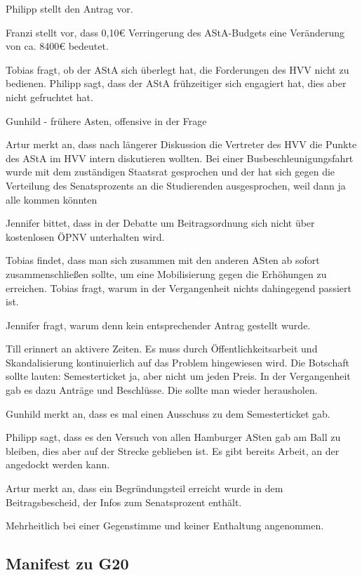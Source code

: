 \documentclass[ngerman,headheight=70pt]{scrartcl}
\begin{document}
    Philipp stellt den Antrag vor.

    Franzi stellt vor, dass 0,10€ Verringerung des AStA-Budgets eine Veränderung
    von ca. 8400€ bedeutet.

    Tobias fragt, ob der AStA sich überlegt hat, die Forderungen des HVV nicht
    zu bedienen. Philipp sagt, dass der AStA frühzeitiger sich engagiert hat,
    dies aber nicht gefruchtet hat.

    Gunhild - frühere Asten, offensive in der Frage

    Artur merkt an, dass nach längerer Diskussion die Vertreter des HVV die
    Punkte des AStA im HVV intern diskutieren wollten. Bei einer Busbeschleunigungsfahrt
    wurde mit dem zuständigen Staatsrat gesprochen und der hat sich gegen die Verteilung
    des Senatsprozents an die Studierenden ausgesprochen, weil dann ja alle kommen
    könnten

    Jennifer bittet, dass in der Debatte um Beitragsordnung sich nicht über
    kostenlosen ÖPNV unterhalten wird.

    Tobias findet, dass man sich zusammen mit den anderen ASten ab sofort
    zusammenschließen sollte, um eine Mobilisierung gegen die Erhöhungen zu
    erreichen. Tobias fragt, warum in der Vergangenheit nichts dahingegend passiert
    ist.

    Jennifer fragt, warum denn kein entsprechender Antrag gestellt wurde.

    Till erinnert an aktivere Zeiten. Es muss durch Öffentlichkeitsarbeit und
    Skandalisierung kontinuierlich auf das Problem hingewiesen wird. Die Botschaft
    sollte lauten: Semesterticket ja, aber nicht um jeden Preis.
    In der Vergangenheit gab es dazu Anträge und Beschlüsse. Die sollte man
    wieder herausholen.

    Gunhild merkt an, dass es mal einen Ausschuss zu dem Semesterticket gab.

    Philipp sagt, dass es den Versuch von allen Hamburger ASten gab am Ball zu
    bleiben, dies aber auf der Strecke geblieben ist. Es gibt bereits Arbeit,
    an der angedockt werden kann.

    Artur merkt an, dass ein Begründungsteil erreicht wurde in dem Beitragsbescheid,
    der Infos zum Senatsprozent enthält.

    Mehrheitlich bei einer Gegenstimme und keiner Enthaltung angenommen.

    \subsection{Manifest zu G20}
\end{document}
